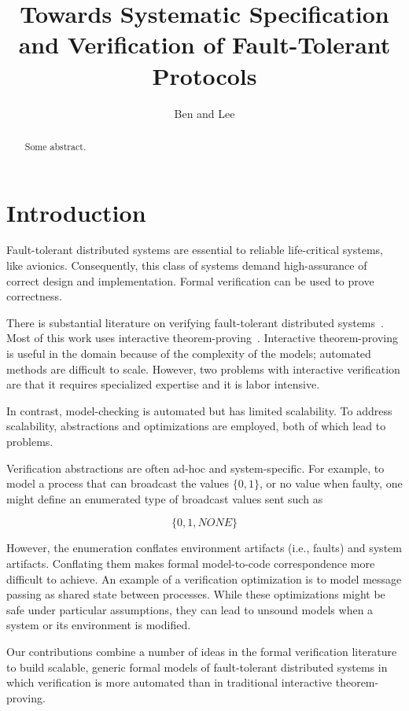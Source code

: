 \documentclass{IEEEtran/IEEEtran}
\begin{document}
\title{Towards Systematic Specification and Verification of Fault-Tolerant Protocols}
\author{Ben and Lee}


\maketitle


\begin{abstract}
  Some abstract.
\end{abstract}

\section{Introduction}

Fault-tolerant distributed systems are essential to reliable life-critical systems, like avionics. Consequently, this class of systems demand high-assurance of correct design and implementation. Formal verification can be used to prove correctness.

There is substantial literature on verifying fault-tolerant distributed systems~\cite{}. Most of this work uses interactive theorem-proving~\cite{}. Interactive theorem-proving is useful in the domain because of the complexity of the models; automated methods are difficult to scale. However, two problems with interactive verification are that it requires specialized expertise and it is labor intensive.

In contrast, model-checking is automated but has limited scalability. To address scalability, abstractions and optimizations are employed, both of which lead to problems.

Verification abstractions are often ad-hoc and system-specific. For example, to model a process that can broadcast the values $\{0, 1\}$, or no value when faulty, one might define an enumerated type of broadcast values sent such as

$$\{0, 1, NONE\}$$

However, the enumeration conflates environment artifacts (i.e., faults) and system artifacts. Conflating them makes formal model-to-code correspondence more difficult to achieve. An example of a verification optimization is to model message passing as shared state between processes. While these optimizations might be safe under particular assumptions, they can lead to unsound models when a system or its environment is modified.

Our contributions combine a number of ideas in the formal verification literature to build scalable, generic formal models of fault-tolerant distributed systems in which verification is more automated than in traditional interactive theorem-proving.
\end{document}

